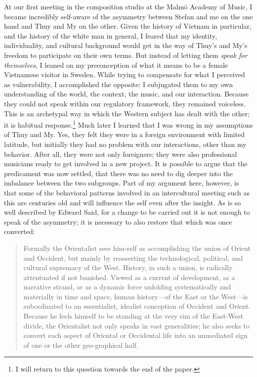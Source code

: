 \documentclass[a4paper]{article}
\begin{document}
At our first meeting in the composition studio at the Malmö Academy of Music, I became incredibly self-aware of the asymmetry between Stefan and me on the one hand and Thuy and My on the other. Given the history of Vietnam in particular, and the history of the white man in general, I feared that my identity, individuality, and cultural background would get in the way of Thuy’s and My’s freedom to participate on their own terms. But instead of letting them \emph{speak for themselves}, I leaned on my preconception of what it means to be a female Vietnamese visitor in Sweden. While trying to compensate for what I perceived as vulnerability, I accomplished the opposite: I subjugated them to my own understanding of the world, the context, the music, and our interaction. Because they could not speak within our regulatory framework, they remained voiceless. This is an archetypal way in which the Western subject has dealt with the other; it is habitual response.\footnote{I will return to this question towards the end of the paper.} Much later I learned that I was wrong in my assumptions of Thuy and My. Yes, they felt they were in a foreign environment with limited latitude, but initially they had no problem with our interactions, other than my behavior. After all, they were not only foreigners; they were also professional musicians ready to get involved in a new project. It is possible to argue that the predicament was now settled, that there was no need to dig deeper into the imbalance between the two subgroups. Part of my argument here, however, is that some of the behavioral patterns involved in an intercultural meeting such as this are centuries old and will influence the self even after the insight. As is so well described by Edward Said, for a change to be carried out it is not enough to speak of the asymmetry; it is necessary to also restore that which was once converted: 

\begin{quote}
  Formally the Orientalist sees him-self as accomplishing the union of Orient
  and Occident, but mainly by reasserting the technological, political, and
  cultural supremacy of the West. History, in such a union, is radically
  attentuated if not banished. Viewed as a current of development, as a
  narrative strand, or as a dynamic force unfolding systematically and
  materially in time and space, human history—of the East or the West—is
  subordinated to an essentialist, idealist conception of Occident and
  Orient. Because he feels himself to be standing at the very rim of the
  East-West divide, the Orientalist not only speaks in vast generalities; he
  also seeks to convert each aspect of Oriental or Occidental life into an
  unmediated sign of one or the other geo-graphical
  half. \autocite[246-7]{said1978}
\end{quote}
\end{document}

